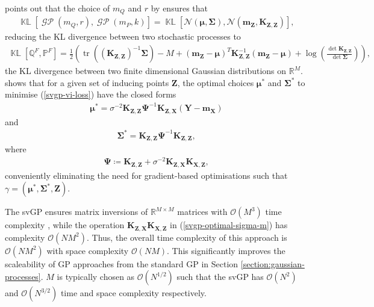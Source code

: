 \documentclass{article}
\newcommand{\KLD}{\operatorname{\mathbb{KL}}}
\newcommand{\tr}{\operatorname{tr}}
\newcommand{\GP}{\operatorname{\mathcal{GP}}}
\numberwithin{equation}{section}
\begin{document}
\cite{matthews2016sparse} points out that the choice of $m_Q$ and $r$ by \cite{titsias2009variational} ensures that
\begin{align}
    \KLD\left[\GP\left(m_Q, r\right), \GP\left(m_P, k\right)\right] = \KLD\left[\mathcal{N}\left(\boldsymbol{\mu}, \mathbf{\Sigma}\right), \mathcal{N}\left(\mathbf{m}_{\mathbf{Z}}, \mathbf{K}_{\mathbf{Z}, \mathbf{Z}}\right)\right],
\end{align}
reducing the KL divergence between two stochastic processes to
\begin{align}
        \KLD\left[\mathbb{Q}^F, \mathbb{P}^F\right]
    = \frac{1}{2}\left( \tr\left(\left(\mathbf{K}_{\mathbf{Z}, \mathbf{Z}}\right)^{-1} \boldsymbol{\Sigma}\right) - M +
    \left(\mathbf{m}_{\mathbf{Z}} - \boldsymbol{\mu}\right)^T \mathbf{K}_{\mathbf{Z}, \mathbf{Z}}^{-1} \left(\mathbf{m}_{\mathbf{Z}} - \boldsymbol{\mu}\right)+ \log\left(\frac{\det\mathbf{K}_{\mathbf{Z}, \mathbf{Z}}}{\det\boldsymbol{\Sigma}}\right) \right),
    \label{kld-closed-form}
\end{align}
the KL divergence between two finite dimensional Gaussian distributions on $\mathbb{R}^M$.
\cite{titsias2009variational} shows that for a given set of inducing points $\mathbf{Z}$, the optimal choices $\boldsymbol{\mu}^*$ and $\mathbf{\Sigma}^*$ to minimise (\ref{svgp-vi-loss}) have the closed forms
\begin{align}
    \label{svgp-optimal-mean}
    \boldsymbol{\mu}^* = \sigma^{-2}\mathbf{K}_{\mathbf{Z}, \mathbf{Z}} \mathbf{\Psi}^{-1}\mathbf{K}_{\mathbf{Z}, \mathbf{X}}  \left(\mathbf{Y} - \mathbf{m}_\mathbf{X}\right)
\end{align}
and
\begin{align}
    \label{svgp-optimal-covariance}
    \mathbf{\Sigma}^* = \mathbf{K}_{\mathbf{Z}, \mathbf{Z}}  \mathbf{\Psi}^{-1}\mathbf{K}_{\mathbf{Z}, \mathbf{Z}},
\end{align}
where
\begin{align}
    \mathbf{\Psi} \coloneqq \mathbf{K}_{\mathbf{Z}, \mathbf{Z}}  + \sigma^{-2}\mathbf{K}_{\mathbf{Z}, \mathbf{X}} \mathbf{K}_{\mathbf{X}, \mathbf{Z}},
    \label{svgp-optimal-sigma-m}
\end{align}
conveniently eliminating the need for gradient-based optimisations such that $\gamma = \left(\boldsymbol{\mu}^*, \mathbf{\Sigma}^*,  \mathbf{Z}\right)$.

The svGP ensures matrix inversions of $\mathbb{R}^{M \times M}$ matrices with $\mathcal{O}\left(M^3\right)$ time complexity , while the operation $\mathbf{K}_{\mathbf{Z}, \mathbf{X}} \mathbf{K}_{\mathbf{X}, \mathbf{Z}}$ in (\ref{svgp-optimal-sigma-m}) has complexity $\mathcal{O}\left(NM^2\right)$.
Thus, the overall time complexity  of this approach is $\mathcal{O}\left(NM^2\right)$ with space complexity $\mathcal{O}\left(NM\right)$.
This significantly improves the scaleability of GP approaches from the standard GP in Section \ref{section:gaussian-processes}. $M$ is typically chosen as $\mathcal{O}(N^{1/2})$ such that the svGP has $\mathcal{O}(N^{2})$ and $\mathcal{O}(N^{3/2})$ time and space complexity respectively.
\end{document}
